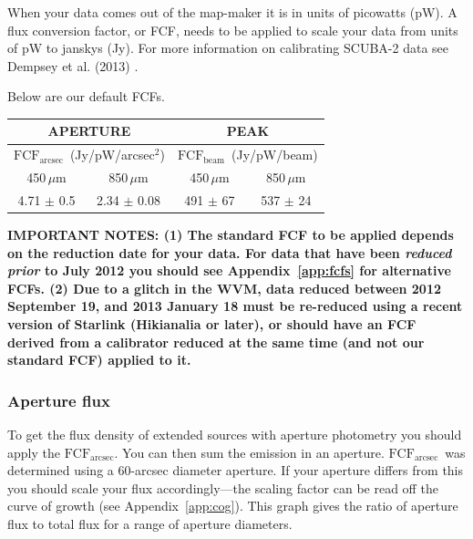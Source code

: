 \documentclass[twoside,11pt]{article}
\newcommand{\htmlref}[2]{#1}
\newcommand{\latex}[1]{#1}
\newcommand{\latexhtml}[2]{#1}
\renewcommand{\_}{\texttt{\symbol{95}}}
\newcommand{\fcfb}{$\mathrm{FCF_{beam}}$}
\newcommand{\fcfa}{$\mathrm{FCF_{arcsec}}$}
\newcommand{\cref}[3]{\latexhtml{#1~\ref{#2}}{\htmlref{#3}{#2}}}
\begin{document}
When your data comes out of the map-maker it is in units of picowatts
(pW). A flux conversion factor, or FCF, needs to be applied to scale
your data from units of pW to janskys (Jy). For more information on calibrating
SCUBA-2 data see Dempsey et al. (2013) \cite{dempsey12}.
\newline

Below are our default FCFs.

\latex{\vspace{0.5cm}}
\latex{\renewcommand*\arraystretch{1.2}}
\begin{table}[h!]
\centering
\begin{tabular}{|c|c|c|c|}
\hline
\multicolumn{2}{|c|}{\textbf{APERTURE}}  &
\multicolumn{2}{c|}{\textbf{PEAK}}      \\
\hline
\multicolumn{2}{|c|}{\fcfa\ (Jy/pW/arcsec$^2$) }  &
\multicolumn{2}{c|}{\fcfb\ (Jy/pW/beam)}      \\
\hline
\hspace{0.4cm} 450\,$\mu$m \hspace{0.3cm} & 850\,$\mu$m & \hspace{0.4cm} 450\,$\mu$m \hspace{0.3cm}& 850\,$\mu$m \\
\hline
4.71 $\pm$ 0.5& 2.34 $\pm$ 0.08& 491 $\pm$ 67& 537 $\pm$ 24 \\
\hline
\end{tabular}
\end{table}
\latex{\renewcommand*\arraystretch{1.0}}
\latex{\vspace{0.5cm}}

\textbf{IMPORTANT NOTES:
  \newline
  (1) The standard FCF to be applied depends on
  the reduction date for your data. For data that have been
  \emph{reduced prior} to July 2012 you should see
  \cref{Appendix}{app:fcfs}{FCFs by reduction date} for alternative FCFs.
  \newline
  (2) Due to a glitch in the WVM, data reduced between 2012 September 19,
  and 2013 January 18 must be re-reduced using a recent version of
  Starlink (Hikianalia or later), or should have an FCF derived from a
  calibrator reduced at the same time (and not our standard FCF) applied
  to it.
}

\subsubsection{Aperture flux}

To get the flux density of extended sources with aperture
photometry you should apply the \fcfa.  You can then sum the emission
in an aperture. \fcfa\ was determined using a 60-arcsec diameter
aperture. If your aperture differs from this you should scale your
flux accordingly---the scaling factor can be read off the curve of
growth (see \cref{Appendix}{app:cog}{this appendix}). This graph gives
the ratio of aperture flux to total flux for a range of aperture diameters.
\end{document}
